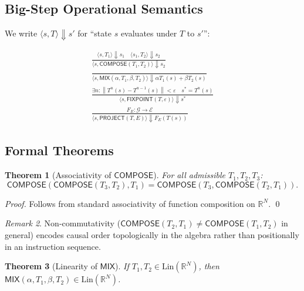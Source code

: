 \documentclass[10pt,twocolumn]{article}
\theoremstyle{plain}
\newtheorem{theorem}{Theorem}[section]
\theoremstyle{definition}
\theoremstyle{remark}
\newtheorem{remark}[theorem]{Remark}
\newcommand{\RR}{\mathbb{R}}
\newcommand{\Compose}{\mathsf{COMPOSE}}
\newcommand{\Mix}{\mathsf{MIX}}
\newcommand{\Fixpoint}{\mathsf{FIXPOINT}}
\newcommand{\Project}{\mathsf{PROJECT}}
\newcommand{\norm}[1]{\left\|#1\right\|}
\begin{document}
\subsection{Big-Step Operational Semantics}

We write $\langle s, T \rangle \Downarrow s'$ for ``state $s$ evaluates under
$T$ to $s'$'':

\begin{gather*}
\frac{\langle s, T_1 \rangle \Downarrow s_1 \quad \langle s_1, T_2 \rangle \Downarrow s_2}
     {\langle s, \Compose(T_1, T_2) \rangle \Downarrow s_2}
\tag{E-Compose}\\[6pt]
\frac{}
     {\langle s, \Mix(\alpha, T_1, \beta, T_2) \rangle \Downarrow \alpha T_1(s) + \beta T_2(s)}
\tag{E-Mix}\\[6pt]
\frac{\exists n\colon \norm{T^n(s) - T^{n-1}(s)} < \varepsilon \quad s^* = T^n(s)}
     {\langle s, \Fixpoint(T, \varepsilon) \rangle \Downarrow s^*}
\tag{E-Fix}\\[6pt]
\frac{F_E\colon \mathcal{G} \to \mathcal{E}}
     {\langle s, \Project(T, E) \rangle \Downarrow F_E(T(s))}
\tag{E-Proj}
\end{gather*}

\subsection{Formal Theorems}
\label{sec:theorems}

\begin{theorem}[Associativity of $\Compose$]
\label{thm:assoc}
For all admissible $T_1, T_2, T_3$:
\[
  \Compose(\Compose(T_3, T_2), T_1) = \Compose(T_3, \Compose(T_2, T_1)).
\]
\end{theorem}

\begin{proof}
Follows from standard associativity of function composition on $\RR^N$. \qed
\end{proof}

\begin{remark}
Non-commutativity ($\Compose(T_2, T_1) \neq \Compose(T_1, T_2)$ in general)
encodes causal order topologically in the algebra rather than positionally in an
instruction sequence.
\end{remark}

\begin{theorem}[Linearity of $\Mix$]
\label{thm:linear}
If $T_1, T_2 \in \mathrm{Lin}(\RR^N)$, then
$\Mix(\alpha, T_1, \beta, T_2) \in \mathrm{Lin}(\RR^N)$.
\end{theorem}
\end{document}
